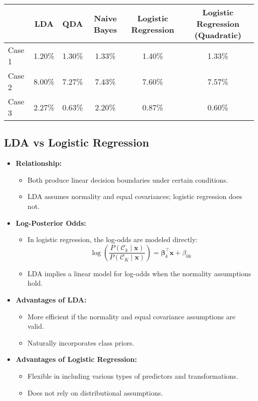 \documentclass{article}
\begin{document}
\begin{center}
\begin{tabular}{lccccc}
\hline
 & LDA & QDA & Naive Bayes & Logistic Regression & Logistic Regression (Quadratic) \\
\hline
Case 1 & 1.20\% & 1.30\% & 1.33\% & 1.40\% & 1.33\% \\
Case 2 & 8.00\% & 7.27\% & 7.43\% & 7.60\% & 7.57\% \\
Case 3 & 2.27\% & 0.63\% & 2.20\% & 0.87\% & 0.60\% \\
\hline
\end{tabular}
\end{center}

\subsection{LDA vs Logistic Regression}

\begin{itemize}
    \item \textbf{Relationship:}
    \begin{itemize}
        \item Both produce linear decision boundaries under certain conditions.
        \item LDA assumes normality and equal covariances; logistic regression does not.
    \end{itemize}
    \item \textbf{Log-Posterior Odds:}
    \begin{itemize}
        \item In logistic regression, the log-odds are modeled directly:
        \[
        \log\left( \frac{P(\mathcal{C}_k \mid \mathbf{x})}{P(\mathcal{C}_K \mid \mathbf{x})} \right) = \boldsymbol{\beta}_k^\top \mathbf{x} + \beta_{0k}
        \]
        \item LDA implies a linear model for log-odds when the normality assumptions hold.
    \end{itemize}
    \item \textbf{Advantages of LDA:}
    \begin{itemize}
        \item More efficient if the normality and equal covariance assumptions are valid.
        \item Naturally incorporates class priors.
    \end{itemize}
    \item \textbf{Advantages of Logistic Regression:}
    \begin{itemize}
        \item Flexible in including various types of predictors and transformations.
        \item Does not rely on distributional assumptions.
    \end{itemize}
\end{itemize}
\end{document}
